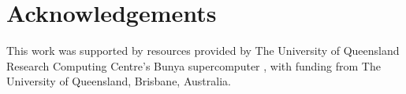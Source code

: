 \documentclass[a4paper,num-refs,gigabyte]{oup-contemporary}
\begin{document}
\section{Acknowledgements}

This work was supported by resources provided by The University of Queensland Research Computing Centre’s Bunya supercomputer \citep{the_university_of_queensland_research_computing_centre_bunya_2024}, with funding from The University of Queensland, Brisbane, Australia.


\end{document}
